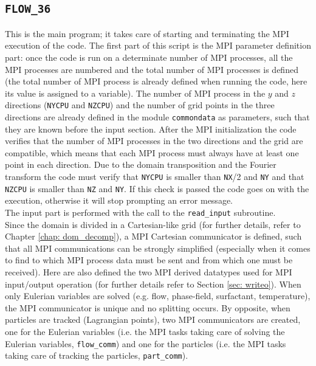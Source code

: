\subsection{\texttt{FLOW\_36}}
This is the main program; it takes care of starting and terminating the MPI execution of the code. 
The first part of this script is the MPI parameter definition part: once the code is run on a determinate number of MPI processes, all the MPI processes are numbered and the total number of MPI processes is defined (the total number of MPI process is already defined when running the code, here its value is assigned to a variable). 
The number of MPI process in the $y$ and $z$ directions (\texttt{NYCPU} and \texttt{NZCPU}) and the number of grid points in the three directions are already defined in the module \texttt{commondata} as parameters, such that they are known before the input section. 
After the MPI initialization the code verifies that the number of MPI processes in the two directions and the grid are compatible, which means that each MPI process must always have at least one point in each direction. Due to the domain transposition and the Fourier transform the code must verify that \texttt{NYCPU} is smaller than \texttt{NX}/2 and \texttt{NY} and that \texttt{NZCPU} is smaller than \texttt{NZ} and \texttt{NY}. If this check is passed the code goes on with the execution, otherwise it will stop prompting an error message.\\
The input part is performed with the call to the \texttt{read\_input} subroutine.\\
Since the domain is divided in a Cartesian-like grid (for further details, refer to Chapter \ref{chap: dom_decomp}), a MPI Cartesian communicator is defined, such that all MPI communications can be strongly simplified (especially when it comes to find to which MPI process data must be sent and from which one must be received). Here are also defined the two MPI derived datatypes used for MPI input/output operation (for further details refer to Section \ref{sec: writeo}).
When only Eulerian variables are solved (e.g. flow, phase-field, surfactant, temperature), the MPI communicator is unique and no splitting occurs. 
By opposite, when particles are tracked (Lagrangian points), two MPI communicators are created, one for the Eulerian variables (i.e. the MPI tasks taking care of solving the Eulerian variables, \texttt{flow\_comm}) and one for the particles (i.e. the MPI tasks taking care of tracking the particles, \texttt{part\_comm}).\\
